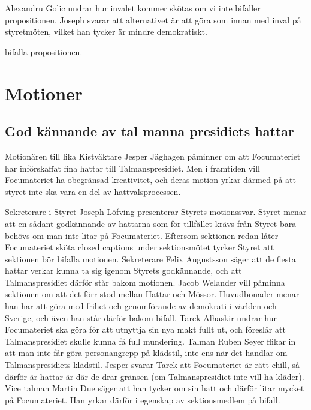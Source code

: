 \documentclass[hidelinks]{sektionsmote} %
\begin{document}
Alexandru Golic undrar hur invalet kommer skötas om vi inte bifaller propositionen.
Joseph svarar att alternativet är att göra som innan med inval på styretmöten, vilket han tycker är mindre demokratiskt.

\begin{beslut}
  \item bifalla propositionen.
\end{beslut}

\section{Motioner}
\subsection{God kännande av tal manna presidiets hattar}
Motionären till lika Kistväktare Jesper Jäghagen påminner om att Focumateriet har införskaffat fina hattar till Talmanspresidiet.
Men i framtiden vill Focumateriet ha obegränsad kreativitet, och \hyperlink{bilagor/motionfoc.pdf.1}{deras motion} yrkar därmed på att styret inte ska vara en del av hattvalsprocessen.

Sekreterare i Styret Joseph Löfving presenterar \hyperlink{bilagor/motionfoc-svar.pdf.1}{Styrets motionssvar}.
Styret menar att en sådant godkännande av hattarna som för tillfället krävs från Styret bara behövs om man inte litar på Focumateriet.
Eftersom sektionen redan låter Focumateriet sköta closed captions under sektionsmötet tycker Styret att sektionen bör bifalla motionen.
Sekreterare Felix Augustsson säger att de flesta hattar verkar kunna ta sig igenom Styrets godkännande, och att Talmanspresidiet därför står bakom motionen.
Jacob Welander vill påminna sektionen om att det förr stod mellan Hattar och Mössor.
Huvudbonader menar han har att göra med frihet och genomförande av demokrati i världen och Sverige, och även han står därför bakom bifall.
Tarek Alhaskir undrar hur Focumateriet ska göra för att utnyttja sin nya makt fullt ut, och föreslår att Talmanspresidiet skulle kunna få full mundering.
Talman Ruben Seyer flikar in att man inte får göra personangrepp på klädstil, inte ens när det handlar om Talmanspresidiets klädstil.
Jesper svarar Tarek att Focumateriet är rätt chill, så därför är hattar är där de drar gränsen (om Talmanspresidiet inte vill ha kläder).
Vice talman Martin Due säger att han tycker om sin hatt och därför litar mycket på Focumateriet.
Han yrkar därför i egenskap av sektionsmedlem på bifall.
\end{document}
